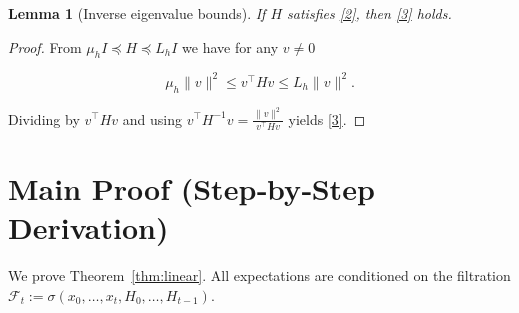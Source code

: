 \documentclass{article}
\newtheorem{lemma}{Lemma}
\begin{document}
\begin{lemma}[Inverse eigenvalue bounds]\label{lem:inverse}
If $H$ satisfies \eqref{2}, then \eqref{3} holds.
\end{lemma}
\begin{proof}
From $\mu_h I\preceq H\preceq L_h I$ we have for any $v\neq0$  

\[
\mu_h\|v\|^{2}\le v^{\top}Hv\le L_h\|v\|^{2}.
\]

Dividing by $v^{\top}Hv$ and using $v^{\top}H^{-1}v = \frac{\|v\|^{2}}{v^{\top}Hv}$ yields \eqref{3}. \qedhere
\end{proof}

\section*{Main Proof (Step‑by‑Step Derivation)}
We prove Theorem~\ref{thm:linear}.  All expectations are conditioned on the filtration $\mathcal{F}_t:=\sigma(x_0,\dots,x_t,H_0,\dots,H_{t-1})$.
\end{document}
